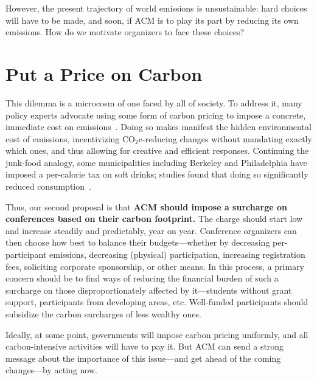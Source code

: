 \documentclass[12pt]{article}
\newcommand{\bcp}[1]{\ifdraft{\bf\textcolor{darkred}{[\bf bcp: #1]}}\fi}
\newcommand{\COtwoE}{CO$_2$e}
\newcommand{\SECTION}{\section*}
\begin{document}
However, the present trajectory of world emissions is unsustainable: hard
choices will have to be made, and soon, if ACM is to play its part by
reducing its own emissions. How do we motivate organizers to face these
choices?

\SECTION{Put a Price on Carbon}
%
This dilemma is a microcosm  of one faced by all of society. To address it,
many policy experts advocate using some form of carbon pricing to impose a
concrete, immediate cost on
emissions~\cite{carbonprice}. Doing so makes manifest the hidden
environmental cost of emissions, incentivizing
{\COtwoE}-reducing changes without mandating exactly which ones, and thus
allowing for creative and efficient responses. Continuing the junk-food
analogy,
some municipalities including Berkeley and Philadelphia have imposed a
per-calorie tax on soft drinks; studies found that doing so
significantly reduced consumption~\cite{sodatax}.

Thus, our second proposal is that {\bf ACM should impose a surcharge on
  conferences based on their carbon footprint.}  The charge should start low
and increase steadily and predictably, year on year.
%
Conference organizers can then choose how best to balance their
budgets---whether
by decreasing per-participant emissions, decreasing (physical)
participation, increasing registration fees, soliciting corporate
sponsorship, or other means.
In this process, a primary concern
should be to find ways of {reducing} the financial burden of such a
surcharge on those disproportionately affected by it---students
without grant support, participants from developing areas, etc.
Well-funded participants should subsidize the carbon surcharges of less
wealthy ones.

Ideally, at some point, governments will impose carbon pricing uniformly,
and all carbon-intensive activities will have to pay it. But ACM can send a
strong message about the importance of this issue---and get ahead of the
coming changes---by acting now.

\end{document}
